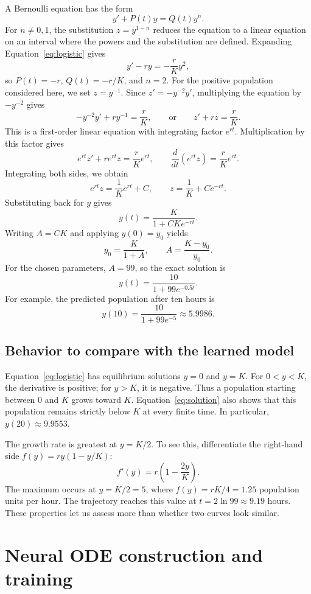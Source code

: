 \documentclass[11pt]{article}
\begin{document}
A Bernoulli equation has the form
\[
 y'+P(t)y=Q(t)y^n.
\]
For $n\ne0,1$, the substitution $z=y^{1-n}$ reduces the equation to a linear
equation on an interval where the powers and the substitution are defined.
Expanding Equation~\eqref{eq:logistic} gives
\[
 y'-ry=-\frac{r}{K}y^2,
\]
so $P(t)=-r$, $Q(t)=-r/K$, and $n=2$. For the positive population considered
here, we set $z=y^{-1}$. Since $z'=-y^{-2}y'$, multiplying the equation by
$-y^{-2}$ gives
\[
 -y^{-2}y'+ry^{-1}=\frac{r}{K},
 \qquad\text{or}\qquad z'+rz=\frac{r}{K}.
\]
This is a first-order linear equation with integrating factor $e^{rt}$.
Multiplication by this factor gives
\[
 e^{rt}z'+re^{rt}z=\frac{r}{K}e^{rt},
 \qquad
 \frac{d}{dt}\left(e^{rt}z\right)=\frac{r}{K}e^{rt}.
\]
Integrating both sides, we obtain
\[
 e^{rt}z=\frac{1}{K}e^{rt}+C,
 \qquad z=\frac{1}{K}+Ce^{-rt}.
\]
Substituting back for $y$ gives
\[
 y(t)=\frac{K}{1+CKe^{-rt}}.
\]
Writing $A=CK$ and applying $y(0)=y_0$ yields
\[
 y_0=\frac{K}{1+A},\qquad A=\frac{K-y_0}{y_0}.
\]
For the chosen parameters, $A=99$, so the exact solution is
\begin{equation}
 y(t)=\frac{10}{1+99e^{-0.5t}}.
 \label{eq:solution}
\end{equation}
For example, the predicted population after ten hours is
\[
 y(10)=\frac{10}{1+99e^{-5}}\approx5.9986.
\]

\subsection{Behavior to compare with the learned model}

Equation~\eqref{eq:logistic} has equilibrium solutions $y=0$ and $y=K$.
For $0<y<K$, the derivative is positive; for $y>K$, it is negative.
Thus a population starting between $0$ and $K$ grows toward $K$.
Equation~\eqref{eq:solution} also shows that this population remains strictly
below $K$ at every finite time. In particular, $y(20)\approx9.9553$.

The growth rate is greatest at $y=K/2$. To see this, differentiate the
right-hand side $f(y)=ry(1-y/K)$:
\[
 f'(y)=r\left(1-\frac{2y}{K}\right).
\]
The maximum occurs at $y=K/2=5$, where $f(y)=rK/4=1.25$ population units per
hour. The trajectory reaches this value at $t=2\ln99\approx9.19$ hours.
These properties let us assess more than whether two curves look similar.

\section{Neural ODE construction and training}
\end{document}
